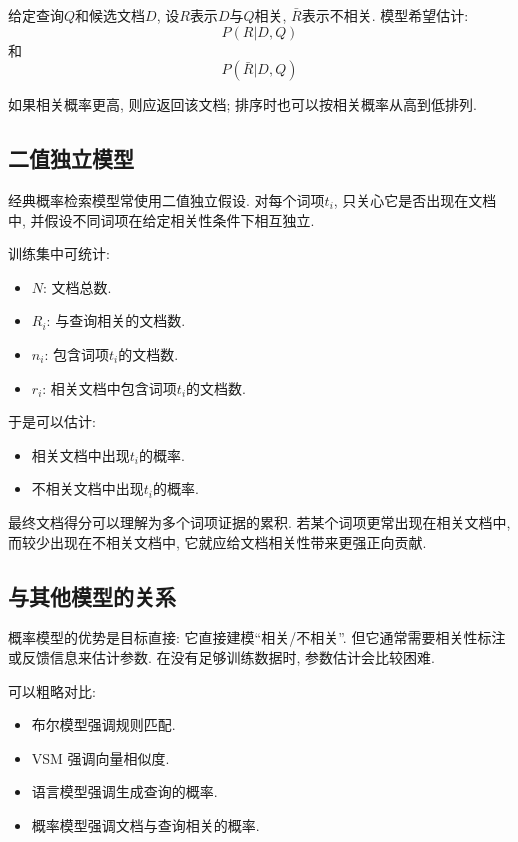 给定查询$Q$和候选文档$D$,
设$R$表示$D$与$Q$相关, $\bar{R}$表示不相关.
模型希望估计:
\[
P(R | D, Q)
\]
和
\[
P(\bar{R} | D, Q)
\]

如果相关概率更高, 则应返回该文档;
排序时也可以按相关概率从高到低排列.

\subsection{二值独立模型}


经典概率检索模型常使用二值独立假设.
对每个词项$t_i$, 只关心它是否出现在文档中,
并假设不同词项在给定相关性条件下相互独立.

训练集中可统计:

\begin{itemize}
\item $N$: 文档总数.
\item $R_i$: 与查询相关的文档数.
\item $n_i$: 包含词项$t_i$的文档数.
\item $r_i$: 相关文档中包含词项$t_i$的文档数.
\end{itemize}

于是可以估计:

\begin{itemize}
\item 相关文档中出现$t_i$的概率.
\item 不相关文档中出现$t_i$的概率.
\end{itemize}

最终文档得分可以理解为多个词项证据的累积.
若某个词项更常出现在相关文档中, 而较少出现在不相关文档中,
它就应给文档相关性带来更强正向贡献.

\subsection{与其他模型的关系}


概率模型的优势是目标直接: 它直接建模“相关/不相关”.
但它通常需要相关性标注或反馈信息来估计参数.
在没有足够训练数据时, 参数估计会比较困难.

可以粗略对比:

\begin{itemize}
\item 布尔模型强调规则匹配.
\item VSM 强调向量相似度.
\item 语言模型强调生成查询的概率.
\item 概率模型强调文档与查询相关的概率.
\end{itemize}

